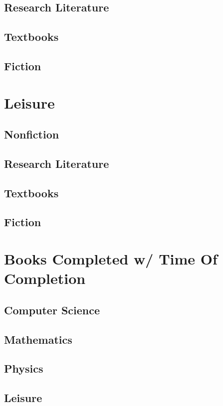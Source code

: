 \documentclass[10pt]{article}
\begin{document}
\subsection{Research Literature}
\subsection{Textbooks}
\subsection{Fiction}

\section{Leisure}
\subsection{Nonfiction}
\subsection{Research Literature}
\subsection{Textbooks}
\subsection{Fiction}



\section{Books Completed w/ Time Of Completion}
\subsection{Computer Science}
\subsection{Mathematics}
\subsection{Physics}
\subsection{Leisure}
\newpage
\end{document}
